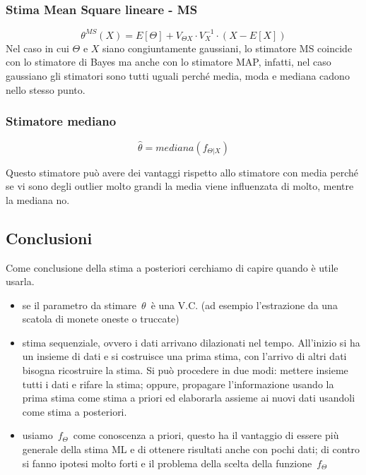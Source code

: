 \subsubsection{Stima Mean Square lineare - MS} %
  \[ \theta^{MS}(X)=E[\Theta]+V_{\Theta X} \cdot V_X^{-1} \cdot (X- E[X]) \]
Nel caso in cui $\Theta$ e $X$ siano congiuntamente gaussiani, lo stimatore MS coincide con lo stimatore di Bayes ma anche con lo stimatore MAP, infatti, nel caso gaussiano gli stimatori sono tutti uguali perché media, moda e mediana cadono nello stesso punto.
\subsubsection{Stimatore mediano} %

  \[ \hat{\theta}=mediana(f_{\Theta|X}) \]
  
Questo stimatore può avere dei vantaggi rispetto allo stimatore con media perché se vi sono degli outlier molto grandi la media viene influenzata di molto, mentre la mediana no.
\subsection{Conclusioni}
Come conclusione della stima a posteriori cerchiamo di capire quando è utile usarla.

  \begin{itemize}
    \item se il parametro da stimare $\theta$ è una V.C. (ad esempio l'estrazione da una scatola di monete oneste o truccate) 
    \item stima sequenziale, ovvero i dati arrivano dilazionati nel tempo. All'inizio si ha un insieme di dati e si costruisce una prima stima, con l'arrivo di altri dati bisogna ricostruire la stima. Si può procedere in due modi: mettere insieme tutti i dati e rifare la stima; oppure, propagare l'informazione usando la prima stima come stima a priori ed elaborarla assieme ai nuovi dati usandoli come stima a posteriori. 
    \item usiamo $f_{\Theta}$ come conoscenza a priori, questo ha il vantaggio di essere più generale della stima ML e di ottenere risultati anche con pochi dati; di contro si fanno ipotesi molto forti e il problema della scelta della funzione $f_{\Theta}$ 
  \end{itemize}
